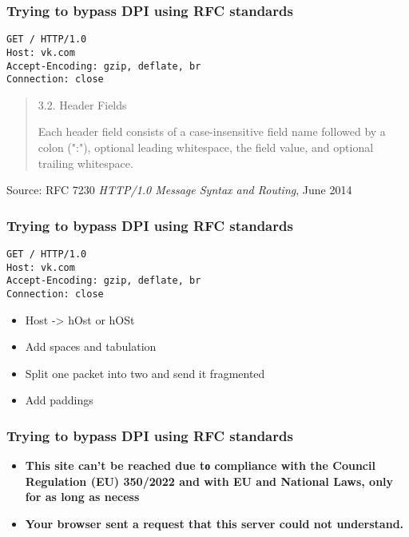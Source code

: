 \documentclass[12pt,aspectratio=169,hyperref={pdftex,unicode},xcolor=dvipsnames]{beamer}
\begin{document}
    
\begin{frame}[fragile] %
    \frametitle{Trying to bypass DPI using RFC standards}
    \begin{verbatim}
GET / HTTP/1.0
Host: vk.com
Accept-Encoding: gzip, deflate, br
Connection: close
    \end{verbatim}
     \begin{quote}
        3.2.  Header Fields

        Each header field consists of a case-insensitive field name followed
        by a colon (":"), optional leading whitespace, the field value, and
        optional trailing whitespace.
    \end{quote}
    \vfill
    \tiny{Source: RFC 7230 \textit{HTTP/1.0 Message Syntax and Routing}, June 2014}
\end{frame}
    

    
\begin{frame}[fragile] %
    \frametitle{Trying to bypass DPI using RFC standards}
    \begin{verbatim}
GET / HTTP/1.0
Host: vk.com
Accept-Encoding: gzip, deflate, br
Connection: close
    \end{verbatim}
    \begin{itemize}
        \item Host -> hOst or hOSt
        \item Add spaces and tabulation
        \item Split one packet into two and send it fragmented
        \item Add paddings
    \end{itemize}
\end{frame}



\begin{frame}[fragile]
    \frametitle{Trying to bypass DPI using RFC standards}

    
    \begin{center}

        \begin{itemize}
        \item \textbf{This site can’t be reached due tο compliance with the Council Regulation (EU) 350/2022 and with EU and National Laws, only for as long as necess}\\ 
    \item  \textbf{Your browser sent a request that this server could not understand.}
       \end{itemize}
    \end{center}
\end{frame}
\end{document}
